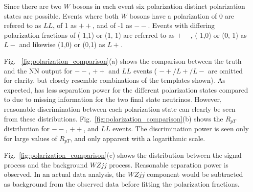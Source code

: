 Since there are two $W$ bosons in each event six polarization distinct polarization states are possible. Events where both $W$ bosons have a polarization of 0 are refered to as $LL$, of 1 as $++$, and of -1 as $--$. Events with differing polarization fractions of (-1,1) or (1,-1) are referred to as $+-$, (-1,0) or (0,-1) as $L-$ and likewise (1,0) or (0,1) as $L+$. 

Fig. ~\ref{fig:polarization_comparison}(a) shows the comparison between the truth \cts and 
the NN output \ctsNN for $--$, $++$ and $LL$ events ( $-+/L+/L-$ are omitted for clarity, but closely resemble combinations of the templates shown). As expected, \ctsNN has less separation 
power for the different polarization states compared to \cts due to missing information for the two final state neutrinos. 
However, reasonable discrimination between each polarization state can clearly be seen from these distributions. 
Fig.~\ref{fig:polarization_comparison}(b) shows the $R_{pT}$ distribution for $--$, $++$, and $LL$ events. 
The discrimination power is seen only for large values of $R_{pT}$, and only apparent with a logarithmic scale.

Fig.~\ref{fig:polarization_comparison}(c) shows the \ctsNN
distribution between the signal \ssWW process and the background
$WZjj$ process.  Reasonable separation power is observed. In an actual
data analysis, the $WZjj$ component would be subtracted as background
from the observed data before fitting the polarization fractions.

